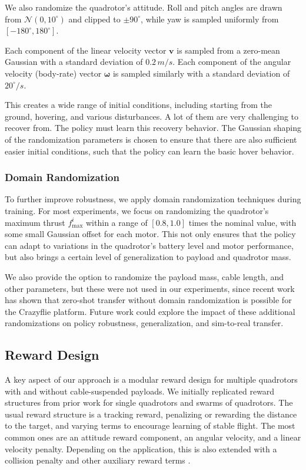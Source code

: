 We also randomize the quadrotor's attitude. Roll and pitch angles are drawn from $\mathcal{N}(0,10^\circ)$ and clipped to $\pm90^\circ$, while yaw is sampled uniformly from $[-180^\circ,180^\circ]$.

Each component of the linear velocity vector $\mathbf{v}$ is sampled from a zero-mean Gaussian with a standard deviation of $0.2\,m/s$. Each component of the angular velocity (body-rate) vector $\boldsymbol{\omega}$ is sampled similarly with a standard deviation of $20^\circ/s$.

This creates a wide range of initial conditions, including starting from the ground, hovering, and various disturbances. A lot of them are very challenging to recover from. The policy must learn this recovery behavior. The Gaussian shaping of the randomization parameters is chosen to ensure that there are also sufficient easier initial conditions, such that the policy can learn the basic hover behavior.
\subsubsection{Domain Randomization}
To further improve robustness, we apply domain randomization techniques during training. For most experiments, we focus on randomizing the quadrotor's maximum thrust $f_{\max}^i$ within a range of $[0.8,1.0]$ times the nominal value, with some small Gaussian offset for each motor. This not only ensures that the policy can adapt to variations in the quadrotor's battery level and motor performance, but also brings a certain level of generalization to payload and quadrotor mass.

We also provide the option to randomize the payload mass, cable length, and other parameters, but these were not used in our experiments, since recent work \cite{Eschmann2024} has shown that zero-shot transfer without domain randomization is possible for the Crazyflie platform. Future work could explore the impact of these additional randomizations on policy robustness, generalization, and sim-to-real transfer.




\subsection{Reward Design}
A key aspect of our approach is a modular reward design for multiple quadrotors with and without cable-suspended payloads.
We initially replicated reward structures from prior work for single quadrotors and swarms of quadrotors. The usual reward structure is a tracking reward, penalizing or rewarding the distance to the target, and varying terms to encourage learning of stable flight. The most common ones are an attitude reward component, an angular velocity, and a linear velocity penalty. Depending on the application, this is also extended with a collision penalty and other auxiliary reward terms \autocite{molchanov_sim--multi-real_2019,Eschmann2024,kaufmann_benchmark_2022, huang_collision_2024}.

